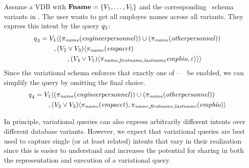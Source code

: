 \begin{example}
\label{eg:vq-same-intent-mult-vars}
Assume a VDB with  \ensuremath{\fSet = \setDef{\vOne, \ldots, \vFive}}
and the corresponding \basic\ schema
variants in . The user wants to get all employee names across all
variants. They express this intent by the query $\vQ_3$:
%
\begin{align*}
\vQ_3 &= 
  \vOne\chcL
    (\pi_{\name}(\engemp)) \cup (\pi_{\name}(\othemp)) \\
 & \qquad,
    (\vTwo\vee\vThree)\chcL
      \pi_{\name}(\empacct) \\
 & \qquad\qquad,
      \chc[(\vFour\vee\vFive)]{\pi_{\name,\fname,\lname}\empbio, \emp}\chcR\chcR
\end{align*}
%
Since the variational schema enforces that exactly one of \vOne--\ \vFive\ be enabled, we
can simplify the query by omitting the final choice.
%
\begin{align*}
\vQ_4 &= 
  \vOne\chcL
    (\pi_{\name}(\engemp)) \cup (\pi_{\name}(\othemp)) \\
 & \qquad,
    \chc[(\vTwo\vee\vThree)]{
      \pi_{\name}(\empacct),
      \pi_{\name,\fname,\lname}(\empbio)}
\end{align*}
%
\end{example}

In principle, variational queries can also express arbitrarily different intents over
different database variants. However, we expect that variational queries are best used to
capture single (or at least related) intents that vary in their realization
since this is easier to understand and increases the potential for sharing in
both the representation and execution of a variational query.





%

